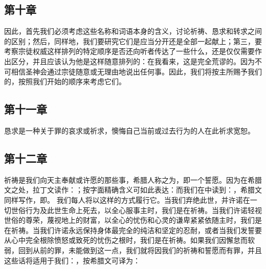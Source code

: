
\subsection{第十章}

\par

因此，首先我们必须考虑这些名称和词语本身的含义，讨论祈祷、恳求和转求之间的区别；然后，同样地，我们要研究它们是应当分开还是全部一起献上；第三，要考察宗徒权威这样排列的特定顺序是否还向听者传达了一些什么，还是仅仅需要作出区分，并且应该认为他是这样随意排列的：在我看来，这是完全荒谬的。因为不可相信圣神会通过宗徒随意或无理由地说出任何事。因此，我们将按主所赐予我们的，按照我们开始的顺序来考虑它们。\par


\subsection{第十一章}

\par

 恳求是一种关于罪的哀求或祈求，懊悔自己当前或过去行为的人在此祈求宽恕。\par


\subsection{第十二章}

\par

祈祷是我们向天主奉献或许愿的那些事，希腊人称之为，即一个誓愿。因为在希腊文之处，拉丁文读作：；按字面精确含义可如此表达：而我们在中读到：，希腊文同样写作，即。 我们每人将以这样的方式履行它。当我们弃绝此世，并许诺在一切世俗行为及此世生命上死去，以全心服事主时，我们是在祈祷。当我们许诺轻视世俗的尊荣，蔑视地上的财富，以全心的忧伤和心灵的谦卑紧紧依随主时，我们是在祈祷。当我们许诺永远保持身体最完全的纯洁和坚定的忍耐，或者当我们发誓要从心中完全根除愤怒或致死的忧伤之根时，我们是在祈祷。如果我们因懈怠而软弱，回到从前的罪，未能做到这一点，我们就将因我们的祈祷和誓愿而有罪，并且这些话将适用于我们：，按希腊文可译为：\par

